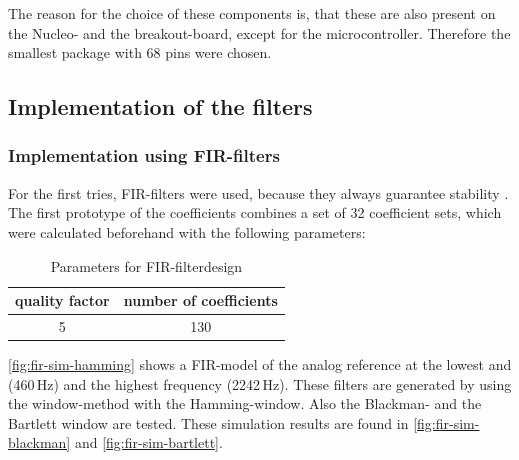 The reason for the choice of these components is, that these are also present on the Nucleo- and the
breakout-board, except for the microcontroller. Therefore the smallest package with 68 pins were chosen.

\subsection{Implementation of the filters}

\subsubsection{Implementation using \ac{FIR}-filters}

For the first tries, \ac{FIR}-filters were used, because they always guarantee stability \cite{meyer_signalverarbeitung}.
The first prototype of the coefficients combines a set of 32 coefficient sets, which were calculated beforehand
with the following parameters:

\begin{table}[!h]
    \centering
    \caption{Parameters for \ac{FIR}-filterdesign}
    \label{table:fir-filterdesign}
    \begin{tabular}{c | c }
        quality factor & number of coefficients\\
        \hline
        5 & 130
    \end{tabular}
\end{table}

\autoref{fig:fir-sim-hamming} shows a \ac{FIR}-model of the analog reference at the lowest and (460\,Hz) and the highest
frequency (2242\,Hz). These filters are generated by using the window-method with the Hamming-window.
Also the Blackman- and the Bartlett window are tested. These simulation results are found in
\autoref{fig:fir-sim-blackman} and \autoref{fig:fir-sim-bartlett}.


